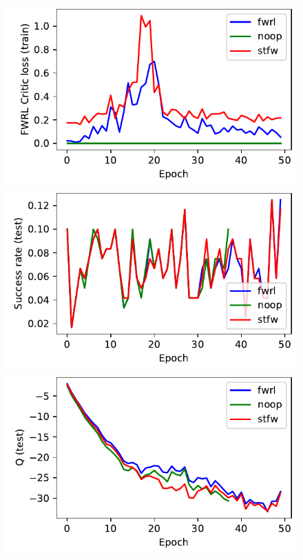 \begin{figure}
  \includegraphics[width=\frac\columnwidth]{media/res/ea0e35b-FetchPush-v1-stfw-future/train/critic_addnl_loss.pdf}\\
  \includegraphics[width=\frac\columnwidth]{media/res/ea0e35b-FetchPush-v1-stfw-none/test/success_rate.pdf}%
  \includegraphics[width=\frac\columnwidth]{media/res/ea0e35b-FetchPush-v1-stfw-none/test/mean_Q.pdf}%

\end{figure}
